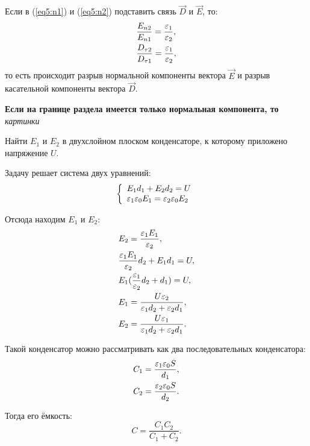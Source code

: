     Если в (\ref{eq5:n1}) и (\ref{eq5:n2}) подставить связь \( \vec{D} \) и
    \( \vec{E} \), то:
    \begin{align*}
        & \frac{E_{n2}}{E_{n1}} = \frac{\varepsilon_1}{\varepsilon_2}, \\
        & \frac{D_{\tau2}}{D_{\tau1}} = \frac{\varepsilon_1}{\varepsilon_2},
    \end{align*}
    то есть происходит разрыв нормальной компоненты вектора \( \vec{E} \) и
    разрыв касательной компоненты вектора \( \vec{D} \).
    
    \textbf{Если на границе раздела имеется только нормальная компонента, то}
    \textit{картинки}
    
    \begin{example}
        Найти \( E_1 \) и \( E_2 \) в двухслойном плоском конденсаторе, к
        которому приложено напряжение \( U \).
    \end{example}
    
    \begin{solution}
        Задачу решает система двух уравнений:
        \[
            \left\{
            \begin{array}{l}
                E_1d_1 + E_2d_2 = U \\
                \varepsilon_1\varepsilon_0E_1 = \varepsilon_2\varepsilon_0E_2
            \end{array}
            \right.
        \]
        
        Отсюда находим \( E_1 \) и \( E_2 \):
        \begin{align*}
            & E_2 = \frac{\varepsilon_1E_1}{\varepsilon_2}, \\
            & \frac{\varepsilon_1E_1}{\varepsilon_2}d_2 + E_1d_1 = U, \\
            & E_1(\frac{\varepsilon_1}{\varepsilon_2}d_2 + d_1) =  U, \\
            & E_1 = \frac{U\varepsilon_2}{\varepsilon_1d_2 + \varepsilon_2d_1}, \\
            & E_2 = \frac{U\varepsilon_1}{\varepsilon_1d_2 + \varepsilon_2d_1}.
        \end{align*}
    \end{solution}
    
    Такой конденсатор можно рассматривать как два последовательных конденсатора:
    \begin{align*}
        C_1 = \frac{\varepsilon_1\varepsilon_0S}{d_1}, \\
        C_2 = \frac{\varepsilon_2\varepsilon_0S}{d_2}. 
    \end{align*}
    
    Тогда его ёмкость:
    \[
        C = \frac{C_1C_2}{C_1 + C_2}.
    \]
    
